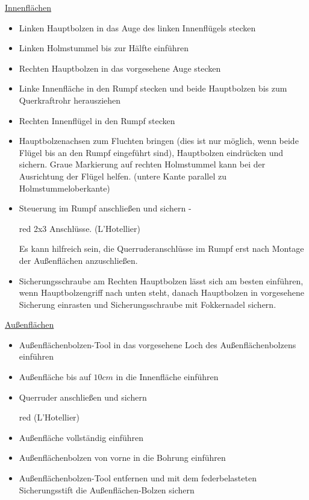 \underline{Innenflächen}
\begin{itemize}
\item Linken Hauptbolzen in das Auge des linken Innenflügels stecken
\item Linken Holmstummel bis zur Hälfte einführen
\item Rechten Hauptbolzen in das vorgesehene Auge stecken
\item Linke Innenfläche in den Rumpf stecken und beide Hauptbolzen bis zum Querkraftrohr herausziehen
\item Rechten Innenflügel in den Rumpf stecken
\item Hauptbolzenachsen zum Fluchten bringen (dies ist nur möglich, wenn beide Flügel bis an den Rumpf eingeführt sind), Hauptbolzen eindrücken und sichern. Graue Markierung auf rechten Holmstummel kann bei der Ausrichtung der Flügel helfen. (untere Kante parallel zu Holmstummeloberkante)
\item Steuerung im Rumpf anschließen und sichern - \begin{color}{red} 2x3 Anschlüsse. (L'Hotellier) \end{color} Es kann hilfreich sein, die Querruderanschlüsse im Rumpf erst nach Montage der Außenflächen anzuschließen.
\item Sicherungsschraube am Rechten Hauptbolzen lässt sich am besten einführen, wenn Hauptbolzengriff nach unten steht, danach Hauptbolzen in vorgesehene Sicherung einrasten und Sicherungsschraube mit Fokkernadel sichern.
\end{itemize}

\underline{Außenflächen}
\begin{itemize}
\item Außenflächenbolzen-Tool in das vorgesehene Loch des Außenflächenbolzens einführen
\item Außenfläche bis auf $10cm$ in die Innenfläche einführen
\item Querruder anschließen und sichern \begin{color}{red} (L'Hotellier) \end{color}
\item Außenfläche vollständig einführen
\item Außenflächenbolzen von vorne in die Bohrung einführen
\item Außenflächenbolzen-Tool entfernen und mit dem federbelasteten Sicherungsstift die Außenflächen-Bolzen sichern 
\end{itemize}

